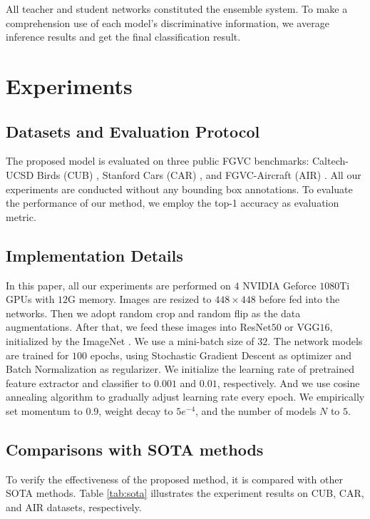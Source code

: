 \documentclass{article}
\begin{document}
All teacher and student networks constituted the ensemble system. To make a comprehension use of each model's discriminative information, we average inference results and get the final classification result.


\section{Experiments}



\subsection{Datasets and Evaluation Protocol}
The proposed model is evaluated on three public FGVC benchmarks: Caltech-UCSD Birds (CUB) \cite{WahCUB_200_2011}, Stanford Cars (CAR) \cite{krause20133d}, and FGVC-Aircraft (AIR) \cite{DBLP:journals/corr/MajiRKBV13}. All our experiments are conducted without any bounding box annotations. To evaluate the performance of our method, we employ the top-1 accuracy as evaluation metric.



\subsection{Implementation Details} 

In this paper, all our experiments are performed on $4$ NVIDIA Geforce $1080$Ti GPUs with $12$G memory. Images are resized to $448\times 448$ before fed into the networks. Then we adopt random crop and random flip as the data augmentations. After that, we feed these images into ResNet$50$ or VGG$16$, initialized by the ImageNet \cite{russakovsky2015imagenet}. We use a mini-batch size of $32$. The network models are trained for $100$ epochs, using Stochastic Gradient Descent as optimizer and Batch Normalization \cite{ioffe2015batch} as regularizer. We initialize the learning rate of pretrained feature extractor and classifier to $0.001$ and $0.01$, respectively. And we use cosine annealing algorithm \cite{loshchilov2016sgdr} to gradually adjust learning rate every epoch. We empirically set momentum to $0.9$, weight decay to $5e^{-4}$, and the number of models $N$ to $5$.
\subsection{Comparisons with SOTA methods}

To verify the effectiveness of the proposed method, it is compared with other SOTA methods. Table \ref{tab:sota} illustrates the experiment results on CUB, CAR, and AIR datasets, respectively.
\end{document}
